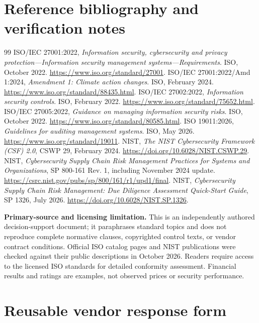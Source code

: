 \documentclass[10pt,letterpaper]{article}
\begin{document}
\section{Reference bibliography and verification notes}
\begin{thebibliography}{99}\small
{} ISO/IEC 27001:2022, \emph{Information security, cybersecurity and privacy protection---Information security management systems---Requirements}. ISO, October 2022. \url{https://www.iso.org/standard/27001}.
 ISO/IEC 27001:2022/Amd 1:2024, \emph{Amendment 1: Climate action changes}. ISO, February 2024. \url{https://www.iso.org/standard/88435.html}.
 ISO/IEC 27002:2022, \emph{Information security controls}. ISO, February 2022. \url{https://www.iso.org/standard/75652.html}.
 ISO/IEC 27005:2022, \emph{Guidance on managing information security risks}. ISO, October 2022. \url{https://www.iso.org/standard/80585.html}.
 ISO 19011:2026, \emph{Guidelines for auditing management systems}. ISO, May 2026. \url{https://www.iso.org/standard/19011}.
 NIST, \emph{The NIST Cybersecurity Framework (CSF) 2.0}, CSWP 29, February 2024. \url{https://doi.org/10.6028/NIST.CSWP.29}.
 NIST, \emph{Cybersecurity Supply Chain Risk Management Practices for Systems and Organizations}, SP 800-161 Rev. 1, including November 2024 update. \url{https://csrc.nist.gov/pubs/sp/800/161/r1/upd1/final}.
 NIST, \emph{Cybersecurity Supply Chain Risk Management: Due Diligence Assessment Quick-Start Guide}, SP 1326, July 2026. \url{https://doi.org/10.6028/NIST.SP.1326}.
\end{thebibliography}
\begin{cautionBox}
\textbf{Primary-source and licensing limitation.} This is an independently authored decision-support document; it paraphrases standard topics and does not reproduce complete normative clauses, copyrighted control texts, or vendor contract conditions. Official ISO catalog pages and NIST publications were checked against their public descriptions in October 2026. Readers require access to the licensed ISO standards for detailed conformity assessment. Financial results and ratings are examples, not observed prices or security performance.
\end{cautionBox}

\appendix
\section{Reusable vendor response form}
\end{document}
